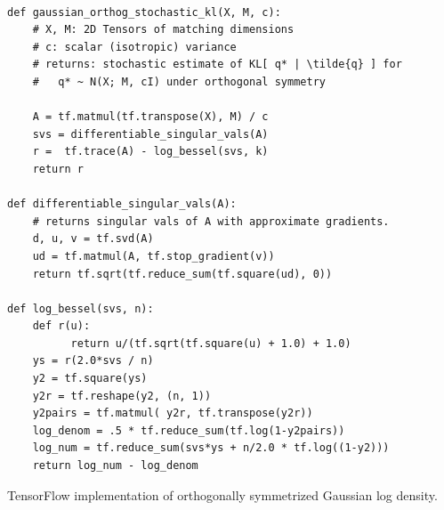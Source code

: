 \documentclass{article}
\newcommand{\N}{\mathcal{N}}
\newcommand{\E}{\mathbb{E}}
\newcommand{\Tr}{\text{Tr}}
\renewcommand{\O}{\text{O}}
\renewcommand{\v}[1]{\mathbf{#1}}
\newcommand{\I}{\v{I}}
\newcommand*\pFq[2]{{}_{#1}F_{#2}}%
\begin{document}
\begin{listing}
\begin{verbatim}

def gaussian_orthog_stochastic_kl(X, M, c):
    # X, M: 2D Tensors of matching dimensions
    # c: scalar (isotropic) variance
    # returns: stochastic estimate of KL[ q* | \tilde{q} ] for 
    #   q* ~ N(X; M, cI) under orthogonal symmetry
    
    A = tf.matmul(tf.transpose(X), M) / c
    svs = differentiable_singular_vals(A)
    r =  tf.trace(A) - log_bessel(svs, k)
    return r

def differentiable_singular_vals(A):
    # returns singular vals of A with approximate gradients. 
    d, u, v = tf.svd(A)
    ud = tf.matmul(A, tf.stop_gradient(v))
    return tf.sqrt(tf.reduce_sum(tf.square(ud), 0))

def log_bessel(svs, n):
    def r(u):
          return u/(tf.sqrt(tf.square(u) + 1.0) + 1.0)
    ys = r(2.0*svs / n)
    y2 = tf.square(ys)
    y2r = tf.reshape(y2, (n, 1))
    y2pairs = tf.matmul( y2r, tf.transpose(y2r))
    log_denom = .5 * tf.reduce_sum(tf.log(1-y2pairs))
    log_num = tf.reduce_sum(svs*ys + n/2.0 * tf.log((1-y2)))
    return log_num - log_denom

\end{verbatim}
\caption{TensorFlow implementation of orthogonally symmetrized
  Gaussian log density.}
\label{listing:stuff}
\end{listing}







\end{document}
